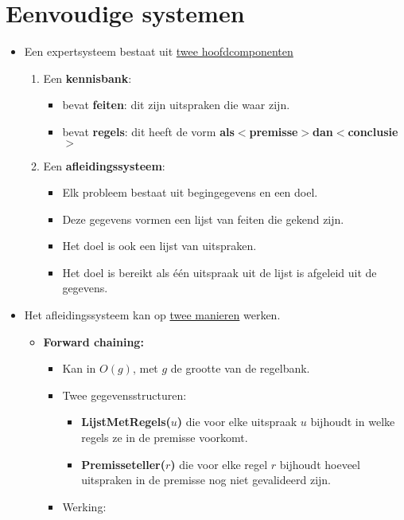\section{Eenvoudige systemen}
\begin{itemize}
	\item Een expertsysteem bestaat uit \underline{twee hoofdcomponenten}
	\begin{enumerate}
		\item Een \textbf{kennisbank}:
		\begin{itemize}
			\item bevat \textbf{feiten}: dit zijn uitspraken die waar zijn.
			\item bevat \textbf{regels}: dit heeft de vorm \textbf{als$<$premisse$>$dan$<$conclusie$>$}
		\end{itemize}
		\item Een \textbf{afleidingssysteem}:
		\begin{itemize}
			\item Elk probleem bestaat uit begingegevens en een doel.
			\item Deze gegevens vormen een lijst van feiten die gekend zijn.
			\item Het doel is ook een lijst van uitspraken.
			\item Het doel is bereikt als één uitspraak uit de lijst is afgeleid uit de gegevens.
		\end{itemize}
	\end{enumerate}
	\item Het afleidingssysteem kan op \underline{twee manieren} werken.
	\begin{itemize}
		\item \textbf{Forward chaining:}
		\begin{itemize}
			\item Kan in $O(g)$, met $g$ de grootte van de regelbank.
			\item Twee gegevensstructuren:
			\begin{itemize}
				\item \textbf{LijstMetRegels($u$)} die voor elke uitspraak $u$ bijhoudt in welke regels ze in de premisse voorkomt.
				\item \textbf{Premisseteller($r$)} die voor elke regel $r$ bijhoudt hoeveel uitspraken in de premisse nog niet gevalideerd zijn.
			\end{itemize}
			\item Werking:
			\begin{enumerate}

\end{enumerate}
\end{itemize}
\end{itemize}
\end{itemize}
